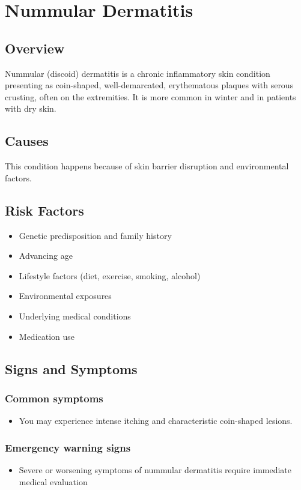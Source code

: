 \chapter{Nummular Dermatitis}
\label{sec:Nummular Dermatitis}

\section{Overview}
Nummular (discoid) dermatitis is a chronic inflammatory skin condition presenting as coin-shaped, well-demarcated, erythematous plaques with serous crusting, often on the extremities. It is more common in winter and in patients with dry skin.
\section{Causes}
This condition happens because of skin barrier disruption and environmental factors.     
\section{Risk Factors}

\begin{itemize}[noitemsep]
  \item Genetic predisposition and family history
  \item Advancing age
  \item Lifestyle factors (diet, exercise, smoking, alcohol)
  \item Environmental exposures
  \item Underlying medical conditions
  \item Medication use
\end{itemize}
\section{Signs and Symptoms}

\subsection{Common symptoms}
\begin{itemize}[noitemsep]
  \item You may experience intense itching and characteristic coin-shaped lesions. 
  \end{itemize}

\subsection{Emergency warning signs}
\begin{itemize}[noitemsep]
  \item Severe or worsening symptoms of nummular dermatitis require immediate medical evaluation
\end{itemize}

